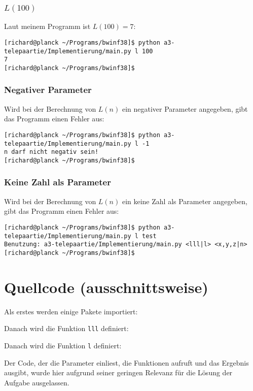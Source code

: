\documentclass[a4paper,10pt,ngerman]{scrartcl}
\begin{document}
\subsubsection{$L(100)$}
Laut meinem Programm ist $L(100) = 7$:
\begin{lstlisting}
[richard@planck ~/Programs/bwinf38]$ python a3-telepaartie/Implementierung/main.py l 100
7
[richard@planck ~/Programs/bwinf38]$ 
\end{lstlisting}
  
\subsubsection{Negativer Parameter}
Wird bei der Berechnung von $L(n)$ ein negativer Parameter angegeben, gibt das Programm einen Fehler aus:
\begin{lstlisting}
[richard@planck ~/Programs/bwinf38]$ python a3-telepaartie/Implementierung/main.py l -1
n darf nicht negativ sein!
[richard@planck ~/Programs/bwinf38]$ 
\end{lstlisting}

\subsubsection{Keine Zahl als Parameter}
Wird bei der Berechnung von $L(n)$ ein keine Zahl als Parameter angegeben, gibt das Programm einen Fehler aus:
\begin{lstlisting}
[richard@planck ~/Programs/bwinf38]$ python a3-telepaartie/Implementierung/main.py l test
Benutzung: a3-telepaartie/Implementierung/main.py <lll|l> <x,y,z|n>
[richard@planck ~/Programs/bwinf38]$ 
\end{lstlisting}


\section{Quellcode (ausschnittsweise)}
Als erstes werden einige Pakete importiert:


Danach wird die Funktion \texttt{lll} definiert:


Danach wird die Funktion \texttt{l} definiert:


Der Code, der die Parameter einliest, die Funktionen aufruft und das Ergebnis ausgibt, wurde hier aufgrund seiner geringen Relevanz für die Lösung der Aufgabe ausgelassen.
\end{document}
